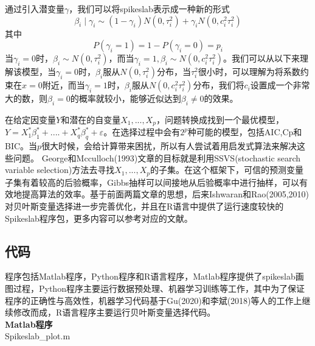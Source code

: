 \documentclass[12pt]{article} %
\begin{document}
	通过引入潜变量$\gamma$，我们可以将spikeslab表示成一种新的形式
	\begin{equation}
		\beta_{i} \mid \gamma_{i} \sim\left(1-\gamma_{i}\right) N\left(0, \tau_{i}^{2}\right)+\gamma_{i} N\left(0, c_{i}^{2} \tau_{i}^{2}\right) \label{ESS1}
	\end{equation}
	其中
	\begin{equation}
		P\left(\gamma_{i}=1\right)=1-P\left(\gamma_{i}=0\right)=p_{i}
	\end{equation}
	当$\gamma_{i}=0$时，$\beta_i \sim N(0,\tau_{i}^2)$，而当$\gamma_{i}=1,\beta_i \sim N(0,c_i^2 \tau_{i}^2)$。我们可以从以下来理解该模型，当$\gamma_{i}=0$时，$\beta_{i}$服从$N(0,\tau_{i}^2)$分布，当$\tau_{i}^2$很小时，可以理解为将系数约束在$x=0$附近，而当$\gamma_{i}=1$时，$\beta_{i}$服从$N(0,c_i^2 \tau_{i}^2)$分布，我们将$c_i$设置成一个非常大的数，则$\beta_{i}=0$的概率就较小，能够近似达到$\beta_{i} \neq 0$的效果。
	
	在给定因变量$Y$和潜在的自变量$X_1,...,X_p$，问题转换成找到一个最优模型，$Y=X_1^*\beta_1^*+....+X_q^*\beta_q^*+\varepsilon$。在选择过程中会有$2^p$种可能的模型，包括AIC,Cp和BIC。当$p$很大时候，会给计算带来困扰，所以有人尝试着用启发式算法来解决这些问题。
	George和Mcculloch(1993)文章的目标就是利用SSVS(stochastic search variable selection)方法去寻找$X_1,...,X_p$的子集。在这个框架下，可信的预测变量子集有着较高的后验概率，Gibbs抽样可以间接地从后验概率中进行抽样，可以有效地提高算法的效率。基于前面两篇文章的思想，后来Ishwaran和Rao(2005,2010)对贝叶斯变量选择进一步完善优化，并且在R语言中提供了运行速度较快的Spikeslab程序包\cite{ishwaran2005spike,ishwaran2010spikeslab}，更多内容可以参考对应的文献。
	
	
	
	
	\newpage
	\subsection{代码}
	程序包括Matlab程序，Python程序和R语言程序，Matlab程序提供了spikeslab画图过程，Python程序主要运行数据预处理、机器学习训练等工作，其中为了保证程序的正确性与高效性，机器学习代码基于Gu(2020)和李斌(2018)等人的工作上继续修改而成\cite{gu2020empirical,李斌2019机器学习驱动的基本面量化投资研究}，R语言程序主要运行贝叶斯变量选择代码。\\
	\textbf{Matlab程序} \\
	Spikeslab\_plot.m
	
\end{document}
